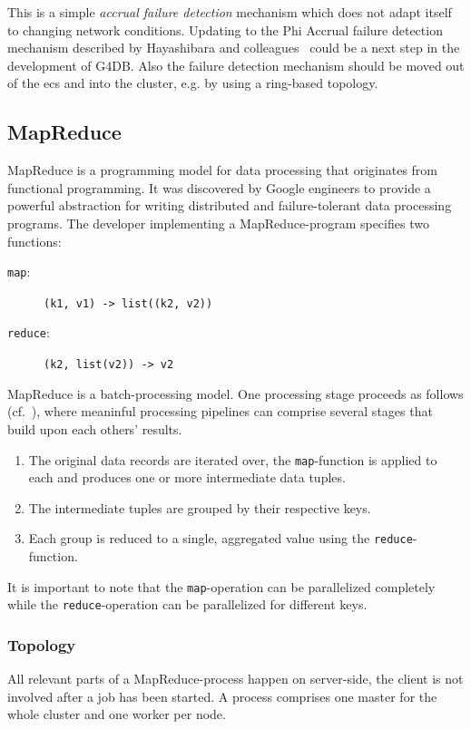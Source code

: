This is a simple \emph{accrual failure detection} mechanism which does not
adapt itself to changing network conditions.
Updating to the Phi Accrual failure
detection mechanism described by Hayashibara and colleagues~\cite{Hayashibara2004} could be a next step in the development of G4DB.
Also the failure detection mechanism should be moved out of the \ac{ecs} and into the cluster,
e.g. by using a ring-based topology.

\subsection{MapReduce}

MapReduce is a programming model for data processing that originates from
functional programming.
It was discovered by Google engineers to provide a powerful abstraction for writing
distributed and failure-tolerant data processing programs.
The developer implementing a MapReduce-program specifies two functions:

\begin{description}
	\item [\texttt{map}:] \texttt{(k1, v1) -> list((k2, v2))}
	\item [\texttt{reduce}:] \texttt{(k2, list(v2)) -> v2}
\end{description}

MapReduce is a batch-processing model.
One processing stage proceeds as follows (cf.~\cite{Laemmel2008}), where 
meaninful processing pipelines can comprise several stages that build upon
each others' results.

\begin{enumerate}
	\item The original data records are iterated over, the \texttt{map}-function
		is applied to each and produces one or more intermediate data tuples.
	\item The intermediate tuples are grouped by their respective keys.
	\item Each group is reduced to a single, aggregated value using the \texttt{reduce}-function. 	
\end{enumerate}

It is important to note that the \texttt{map}-operation can be parallelized
completely while the \texttt{reduce}-operation can be parallelized for
different keys.

\subsubsection{Topology}
All relevant parts of a MapReduce-process happen on server-side, the client is
not involved after a job has been started.
A process comprises one master for the whole cluster and one worker per node.

